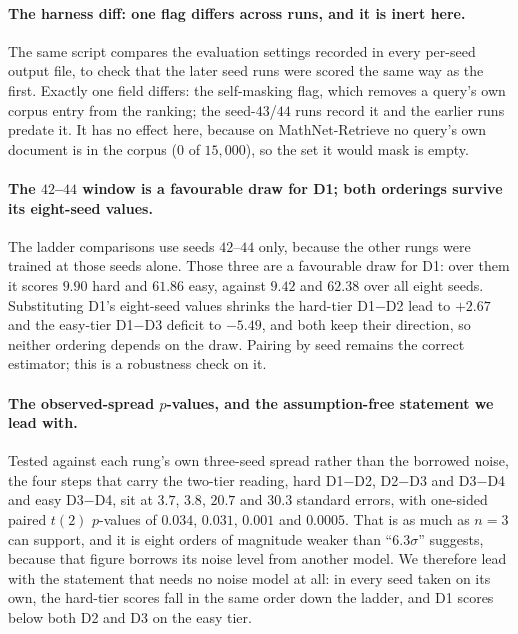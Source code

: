 \paragraph{The harness diff: one flag differs across runs, and it is inert here.}
The same script compares the evaluation settings recorded in every per-seed output file, to check that the later seed runs were scored the same way as the first. Exactly one field differs: the self-masking flag, which removes a query's own corpus entry from the ranking; the seed-$43$/$44$ runs record it and the earlier runs predate it. It has no effect here, because on MathNet-Retrieve no query's own document is in the corpus ($0$ of $15{,}000$), so the set it would mask is empty.

\paragraph{The $42$--$44$ window is a favourable draw for D1; both orderings survive its eight-seed values.}
The ladder comparisons use seeds $42$--$44$ only, because the other rungs were trained at those seeds alone. Those three are a favourable draw for D1: over them it scores $9.90$ hard and $61.86$ easy, against $9.42$ and $62.38$ over all eight seeds. Substituting D1's eight-seed values shrinks the hard-tier D1$-$D2 lead to $+2.67$ and the easy-tier D1$-$D3 deficit to $-5.49$, and both keep their direction, so neither ordering depends on the draw. Pairing by seed remains the correct estimator; this is a robustness check on it.

\paragraph{The observed-spread $p$-values, and the assumption-free statement we lead with.}
Tested against each rung's own three-seed spread rather than the borrowed noise, the four steps that carry the two-tier reading, hard D1$-$D2, D2$-$D3 and D3$-$D4 and easy D3$-$D4, sit at $3.7$, $3.8$, $20.7$ and $30.3$ standard errors, with one-sided paired $t(2)$ $p$-values of $0.034$, $0.031$, $0.001$ and $0.0005$. That is as much as $n = 3$ can support, and it is eight orders of magnitude weaker than ``$6.3\sigma$'' suggests, because that figure borrows its noise level from another model. We therefore lead with the statement that needs no noise model at all: in every seed taken on its own, the hard-tier scores fall in the same order down the ladder, and D1 scores below both D2 and D3 on the easy tier.

